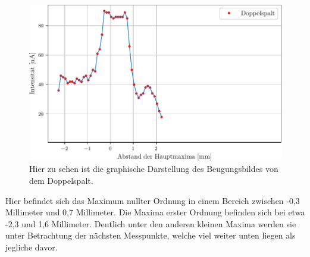 \begin{figure}
  \centering
  \includegraphics{content/double.pdf}
  \caption{Hier zu sehen ist die graphische Darstellung des Beugungsbildes von dem Doppelspalt.}
  \label{fig:double}
\end{figure}

Hier befindet sich das Maximum nullter Ordnung in einem Bereich zwischen -0,3 Millimeter und 0,7 Millimeter. Die Maxima erster Ordnung befinden sich bei etwa -2,3 und 1,6 Millimeter. Deutlich unter den anderen kleinen Maxima werden sie unter Betrachtung der nächsten Messpunkte, welche viel weiter unten liegen als jegliche davor.

\label{sec:Auswertung}